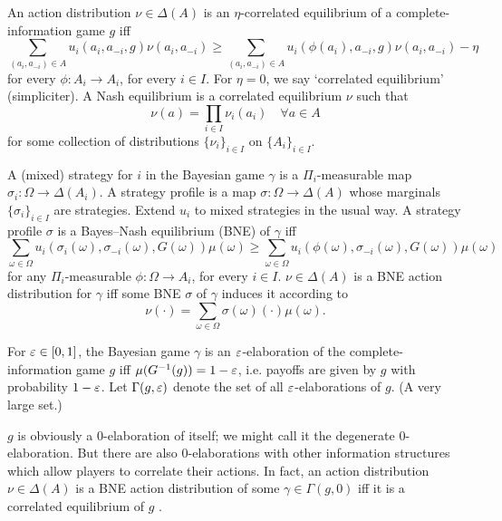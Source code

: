 \documentclass[11pt,letterpaper,reqno,oneside]{article}
\begin{document}
An action distribution $\nu \in \Delta(A)$ is an $\eta$-correlated equilibrium of a complete-information game $g$ iff
%
\begin{equation*}
	\sum_{(a_i,a_{-i}) \in A} u_i(a_i,a_{-i},g) \nu(a_i,a_{-i})
	\geq \sum_{(a_i,a_{-i}) \in A} u_i(\phi(a_i),a_{-i},g) \nu(a_i,a_{-i}) - \eta
\end{equation*}
%
for every $\phi : A_i \to A_i$, for every $i \in I$. For $\eta=0$, we say `correlated equilibrium' (simpliciter). A Nash equilibrium is a correlated equilibrium $\nu$ such that
%
\begin{equation*}
	\nu(a) = \prod_{i \in I} \nu_i(a_i)
	\quad\forall a \in A
\end{equation*}
%
for some collection of distributions $\{ \nu_i \}_{i \in I}$ on $\{ A_i \}_{i \in I}$.

A (mixed) strategy for $i$ in the Bayesian game $\gamma$ is a $\Pi_i$-measurable map $\sigma_i : \Omega \to \Delta(A_i)$. A strategy profile is a map $\sigma : \Omega \to \Delta(A)$ whose marginals $\{ \sigma_i \}_{i \in I}$ are strategies. Extend $u_i$ to mixed strategies in the usual way. A strategy profile $\sigma$ is a Bayes--Nash equilibrium (BNE) of $\gamma$ iff
%
\begin{equation*}
	\sum_{\omega \in \Omega} u_i(\sigma_i(\omega),\sigma_{-i}(\omega),G(\omega)) \mu(\omega)
	\geq \sum_{\omega \in \Omega} u_i(\phi(\omega),\sigma_{-i}(\omega),G(\omega)) \mu(\omega)
\end{equation*}
%
for any $\Pi_i$-measurable $\phi : \Omega \to A_i$, for every $i \in I$. $\nu \in \Delta(A)$ is a BNE action distribution for $\gamma$ iff some BNE $\sigma$ of $\gamma$ induces it according to
%
\begin{equation*}
	\nu(\cdot) = \sum_{\omega \in \Omega} \sigma(\omega)(\cdot) \mu(\omega) .
\end{equation*}


For $\varepsilon \in [0,1]$, the Bayesian game $\gamma$ is an $\varepsilon$-elaboration of the complete-information game $g$ iff $\mu(G^{-1}(g)) = 1-\varepsilon$, i.e. payoffs are given by $g$ with probability $1-\varepsilon$. Let $\Gamma(g,\varepsilon)$ denote the set of all $\varepsilon$-elaborations of $g$. (A very large set.)

$g$ is obviously a $0$-elaboration of itself; we might call it the degenerate $0$-elaboration. But there are also $0$-elaborations with other information structures which allow players to correlate their actions. In fact, an action distribution $\nu \in \Delta(A)$ is a BNE action distribution of some $\gamma \in \Gamma(g,0)$ iff it is a correlated equilibrium of $g$ \parencite{Aumann1987}.
\end{document}
